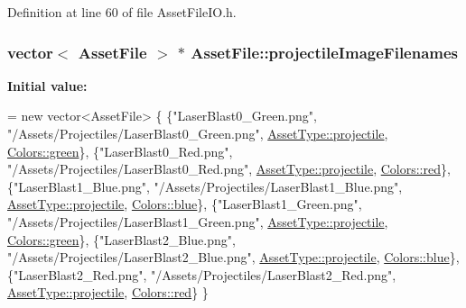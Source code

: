Definition at line 60 of file Asset\-File\-I\-O.\-h.

\hypertarget{struct_asset_file_aa4c45964db96750b68dc082ccbd6adb3}{
\subsubsection[{projectile\-Image\-Filenames}]{\setlength{\rightskip}{0pt plus 5cm}vector$<$ {\bf Asset\-File} $>$ $\ast$ Asset\-File\-::projectile\-Image\-Filenames\hspace{0.3cm}{\ttfamily [static]}}}\label{struct_asset_file_aa4c45964db96750b68dc082ccbd6adb3}
{\bfseries Initial value\-:}
\begin{DoxyCode}
= \textcolor{keyword}{new} vector<AssetFile> \{
    \{\textcolor{stringliteral}{"LaserBlast0\_Green.png"},   \textcolor{stringliteral}{"/Assets/Projectiles/LaserBlast0\_Green.png"},    
      \hyperlink{_asset_file_i_o_8h_a72d924d1cb8e1544b6d5198e98d52ca9abdb3aea80363d8d4bded1ce9f3cdadf2}{AssetType::projectile}, \hyperlink{_character_data_8h_a55ecd4f2ec2ebfe8d5b0163e4ac2a967a9f27410725ab8cc8854a2769c7a516b8}{Colors::green}\},
    \{\textcolor{stringliteral}{"LaserBlast0\_Red.png"},     \textcolor{stringliteral}{"/Assets/Projectiles/LaserBlast0\_Red.png"},      
      \hyperlink{_asset_file_i_o_8h_a72d924d1cb8e1544b6d5198e98d52ca9abdb3aea80363d8d4bded1ce9f3cdadf2}{AssetType::projectile}, \hyperlink{_character_data_8h_a55ecd4f2ec2ebfe8d5b0163e4ac2a967abda9643ac6601722a28f238714274da4}{Colors::red}\},
    \{\textcolor{stringliteral}{"LaserBlast1\_Blue.png"},    \textcolor{stringliteral}{"/Assets/Projectiles/LaserBlast1\_Blue.png"},     
      \hyperlink{_asset_file_i_o_8h_a72d924d1cb8e1544b6d5198e98d52ca9abdb3aea80363d8d4bded1ce9f3cdadf2}{AssetType::projectile}, \hyperlink{_character_data_8h_a55ecd4f2ec2ebfe8d5b0163e4ac2a967a48d6215903dff56238e52e8891380c8f}{Colors::blue}\},
    \{\textcolor{stringliteral}{"LaserBlast1\_Green.png"},   \textcolor{stringliteral}{"/Assets/Projectiles/LaserBlast1\_Green.png"},    
      \hyperlink{_asset_file_i_o_8h_a72d924d1cb8e1544b6d5198e98d52ca9abdb3aea80363d8d4bded1ce9f3cdadf2}{AssetType::projectile}, \hyperlink{_character_data_8h_a55ecd4f2ec2ebfe8d5b0163e4ac2a967a9f27410725ab8cc8854a2769c7a516b8}{Colors::green}\},
    \{\textcolor{stringliteral}{"LaserBlast2\_Blue.png"},    \textcolor{stringliteral}{"/Assets/Projectiles/LaserBlast2\_Blue.png"},     
      \hyperlink{_asset_file_i_o_8h_a72d924d1cb8e1544b6d5198e98d52ca9abdb3aea80363d8d4bded1ce9f3cdadf2}{AssetType::projectile}, \hyperlink{_character_data_8h_a55ecd4f2ec2ebfe8d5b0163e4ac2a967a48d6215903dff56238e52e8891380c8f}{Colors::blue}\},
    \{\textcolor{stringliteral}{"LaserBlast2\_Red.png"},     \textcolor{stringliteral}{"/Assets/Projectiles/LaserBlast2\_Red.png"},      
      \hyperlink{_asset_file_i_o_8h_a72d924d1cb8e1544b6d5198e98d52ca9abdb3aea80363d8d4bded1ce9f3cdadf2}{AssetType::projectile}, \hyperlink{_character_data_8h_a55ecd4f2ec2ebfe8d5b0163e4ac2a967abda9643ac6601722a28f238714274da4}{Colors::red}\}
\}
\end{DoxyCode}


